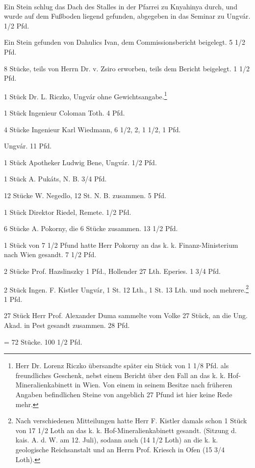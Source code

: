 \documentclass[a4paper, 11pt, oneside, german]{article}
\begin{document}
\paragraph{}
Ein Stein schlug das Dach des Stalles in der Pfarrei zu Knyahinya durch, und wurde auf dem Fußboden liegend gefunden, abgegeben in das Seminar zu Ungvár. 1/2 Pfd.

Ein Stein gefunden von Dahulics Ivan, dem Commissionsbericht beigelegt. 5 1/2 Pfd.

8 Stücke, teils von Herrn Dr. v. Zsiro erworben, teils dem Bericht beigelegt. 1 1/2 Pfd.

1 Stück Dr. L. Riczko, Ungvár ohne Gewichtsangabe.\footnote{Herr Dr. Lorenz Riczko übersandte später ein Stück von 1 1/8 Pfd. als freundliches Geschenk, nebst einem Bericht über den Fall an das k. k. Hof-Mineralienkabinett in Wien. Von einem in seinem Besitze nach früheren Angaben befindlichen Steine von angeblich 27 Pfund ist hier keine Rede mehr.}

1 Stück Ingenieur Coloman Toth. 4 Pfd.

4 Stücke Ingenieur Karl Wiedmann, 6 1/2, 2, 1 1/2, 1 Pfd.

Ungvár. 11 Pfd.

1 Stück Apotheker Ludwig Bene, Ungvár. 1/2 Pfd.

1 Stück A. Pukáts, N. B. 3/4 Pfd.

12 Stücke W. Negedlo, 12 St. N. B. zusammen. 5 Pfd.

1 Stück Direktor Riedel, Remete. 1/2 Pfd.

6 Stücke A. Pokorny, die 6 Stücke zusammen. 13 1/2 Pfd.

1 Stück von 7 1/2 Pfund hatte Herr Pokorny an das k. k. Finanz-Ministerium nach Wien gesandt. 7 1/2 Pfd.

2 Stücke Prof. Hazslinszky 1 Pfd., Hollender 27 Lth. Eperies. 1 3/4 Pfd.

2 Stück Ingen. F. Kistler Ungvár, 1 St. 12 Lth., 1 St. 13 Lth. und noch mehrere.\footnote{Nach verschiedenen Mitteilungen hatte Herr F. Kistler damals schon 1 Stück von 17 1/2 Loth an das k. k. Hof-Mineralienkabinett gesandt. (Sitzung d. kais. A. d. W. am 12. Juli), sodann auch (14 1/2 Loth) an die k. k. geologische Reichsanstalt und an Herrn Prof. Kriesch in Ofen (15 3/4 Loth).} 1 Pfd.

27 Stück Herr Prof. Alexander Duma sammelte vom Volke 27 Stück, an die Ung. Akad. in Pest gesandt zusammen. 28 Pfd.

\hspace*{15mm}= 72 Stücke. 100 1/2 Pfd.
\end{document}
